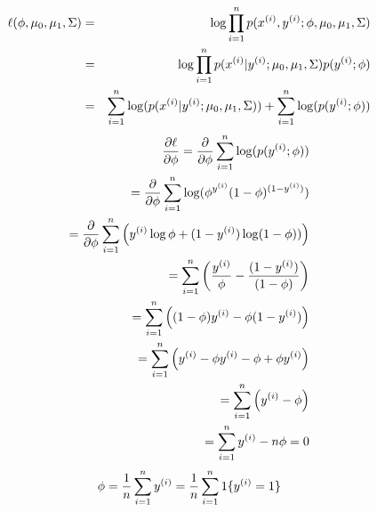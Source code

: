 \begin{answer}
  \begin{eqnarray*}
\ell(\phi, \mu_{0}, \mu_1, \Sigma) &=& \log \prod_{i=1}^{n} p(x^{(i)} , y^{(i)};\phi, \mu_{0}, \mu_1, \Sigma) \\
&=& \log \prod_{i=1}^{n} p(x^{(i)} | y^{(i)}; \mu_{0}, \mu_1, \Sigma) p(y^{(i)};\phi) \\
&=& \sum_{i=1}^{n} \log ( p(x^{(i)} | y^{(i)}; \mu_{0}, \mu_1, \Sigma) ) + \sum_{i=1}^{n} \log ( p(y^{(i)};\phi) )
  \end{eqnarray*}
  \begin{eqnarray*}
\frac{\partial\ell}{\partial\phi}=\frac{\partial}{\partial\phi}\sum_{i=1}^{n} \log ( p(y^{(i)};\phi) )\\
=\frac{\partial}{\partial\phi}\sum_{i=1}^{n} \log (\phi^{y^{(i)}} (1-\phi)^{(1-y^{(i)})} )\\
=\frac{\partial}{\partial\phi}\sum_{i=1}^{n} \left( y^{(i)}\log \phi+(1-y^{(i)})\log (1-\phi) ) \right)\\
=\sum_{i=1}^{n} \left( \frac{y^{(i)}}{\phi}-\frac{(1-y^{(i)})}{(1-\phi)}  \right)\\
=\sum_{i=1}^{n} \left( (1-\phi)y^{(i)}-\phi(1-y^{(i)})  \right)\\
=\sum_{i=1}^{n} \left( y^{(i)}-\phi y^{(i)}-\phi+\phi y^{(i)}  \right)\\
=\sum_{i=1}^{n} \left( y^{(i)}-\phi \right)\\
=\sum_{i=1}^{n} y^{(i)}-{n}\phi=0
  \end{eqnarray*}
  \begin{eqnarray*}
\phi=\frac{1}{{n}}\sum_{i=1}^{n} y^{(i)}=\frac{1}{{n}} \sum_{i=1}^{n} 1\{y^{(i)} = 1\}
  \end{eqnarray*}
\end{answer}
